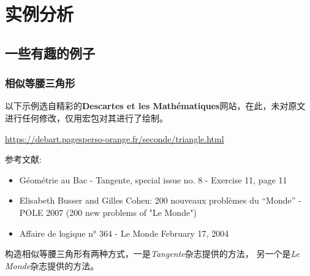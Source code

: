 \documentclass[../main.tex]{subfiles}
\begin{document}
\section{实例分析}

\subsection{一些有趣的例子}

\subsubsection{相似等腰三角形}

以下示例选自精彩的\textbf{Descartes et les Mathématiques}网站，在此，未对原文
进行任何修改，仅用宏包对其进行了绘制。

\url{https://debart.pagesperso-orange.fr/seconde/triangle.html}

参考文献:

\begin{itemize}

\item Géométrie au Bac - Tangente, special issue no. 8 - Exercise 11, page 11


\item Elisabeth Busser and Gilles Cohen: 200 nouveaux problèmes du \enquote{Monde} -
POLE 2007 (200 new problems of "Le Monde")


\item Affaire de logique n° 364 - Le Monde February 17, 2004
\end{itemize}


构造相似等腰三角形有两种方式，一是\textit{Tangente}杂志提供的方法，
另一个是\textit{Le Monde}杂志提供的方法。
\end{document}
